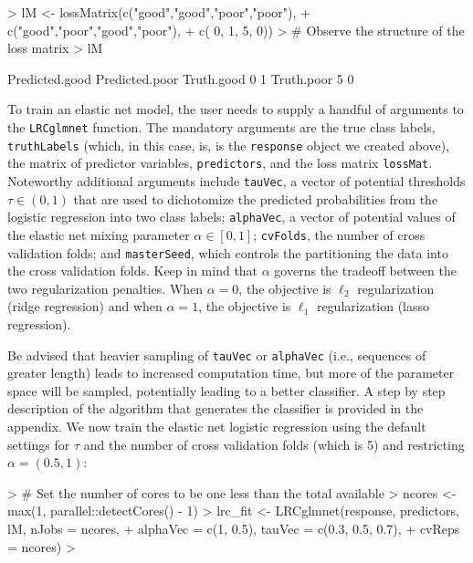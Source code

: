 \documentclass{article}
\begin{document}
\begin{Schunk}
\begin{Sinput}
> lM <- lossMatrix(c("good","good","poor","poor"),
+                  c("good","poor","good","poor"),
+                  c(     0,     1,     5,     0))
> # Observe the structure of the loss matrix
> lM
\end{Sinput}
\begin{Soutput}
           Predicted.good Predicted.poor
Truth.good              0              1
Truth.poor              5              0
\end{Soutput}
\end{Schunk}

To train an elastic net model, the user needs to supply a handful of arguments to the {\tt LRCglmnet} function. 
The mandatory arguments are the true class labels, {\tt truthLabels} (which, in this case, is, is the {\tt response} 
object we created above), the matrix of predictor variables, {\tt predictors}, 
and the loss matrix {\tt lossMat}. Noteworthy additional arguments include {\tt tauVec}, a vector of potential 
thresholds $\tau \in (0, 1)$ that are used to dichotomize the predicted probabilities from the logistic regression 
into two class labels; {\tt alphaVec}, a vector of potential values of the elastic net mixing parameter 
$\alpha \in [0, 1]$; {\tt cvFolds}, the number of cross validation folds; and {\tt masterSeed}, which controls 
the partitioning the data into the cross validation folds. Keep in mind that $\alpha$ governs the tradeoff between 
the two regularization penalties. When $\alpha = 0$, the objective is $\ell_2$ regularization (ridge regression) 
and when $\alpha = 1$, the objective is $\ell_1$ regularization (lasso regression).   

Be advised that heavier sampling of {\tt tauVec} or {\tt alphaVec} (i.e., sequences of greater length) leads to 
increased computation time, but more of the parameter space will be sampled, potentially leading to a better 
classifier. A step by step description of the algorithm that generates the classifier is provided in the appendix.  
We now train the elastic net logistic regression using the default settings for $\tau$ and the number of cross 
validation folds (which is 5) and restricting $\alpha = (0.5, 1)$:
\begin{Schunk}
\begin{Sinput}
> # Set the number of cores to be one less than the total available
> ncores <- max(1, parallel::detectCores() - 1)
> lrc_fit <- LRCglmnet(response, predictors, lM, nJobs = ncores,
+                      alphaVec = c(1, 0.5), tauVec = c(0.3, 0.5, 0.7),
+                      cvReps = ncores)
> 
\end{Sinput}
\end{Schunk}
\end{document}
